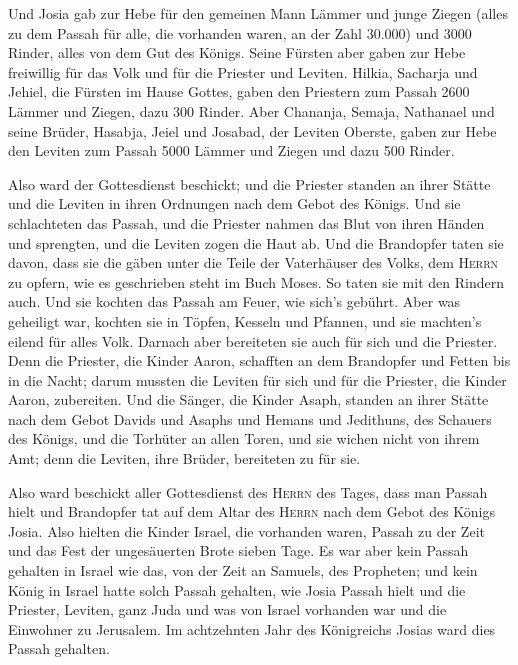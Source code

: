  Und Josia gab zur Hebe für den gemeinen Mann Lämmer und
junge Ziegen (alles zu dem Passah für alle, die vorhanden waren, an der
Zahl 30.000) und 3000 Rinder, alles von dem Gut des Königs.
 Seine Fürsten aber gaben zur Hebe freiwillig für das Volk
und für die Priester und Leviten. Hilkia, Sacharja und Jehiel, die
Fürsten im Hause Gottes, gaben den Priestern zum Passah 2600 Lämmer und
Ziegen, dazu 300 Rinder.  Aber Chananja, Semaja, Nathanael
und seine Brüder, Hasabja, Jeiel und Josabad, der Leviten Oberste, gaben
zur Hebe den Leviten zum Passah 5000 Lämmer und Ziegen und dazu 500
Rinder.

 Also ward der Gottesdienst beschickt; und die Priester
standen an ihrer Stätte und die Leviten in ihren Ordnungen nach dem
Gebot des Königs.  Und sie schlachteten das Passah, und
die Priester nahmen das Blut von ihren Händen und sprengten, und die
Leviten zogen die Haut ab.  Und die Brandopfer taten sie
davon, dass sie die gäben unter die Teile der Vaterhäuser des Volks, dem
\textsc{Herrn} zu opfern, wie es geschrieben steht im Buch Moses. So
taten sie mit den Rindern auch.  Und sie kochten das
Passah am Feuer, wie sich's gebührt. Aber was geheiligt war, kochten sie
in Töpfen, Kesseln und Pfannen, und sie machten's eilend für alles Volk.
 Darnach aber bereiteten sie auch für sich und die
Priester. Denn die Priester, die Kinder Aaron, schafften an dem
Brandopfer und Fetten bis in die Nacht; darum mussten die Leviten für
sich und für die Priester, die Kinder Aaron, zubereiten. 
Und die Sänger, die Kinder Asaph, standen an ihrer Stätte nach dem Gebot
Davids und Asaphs und Hemans und Jedithuns, des Schauers des Königs, und
die Torhüter an allen Toren, und sie wichen nicht von ihrem Amt; denn
die Leviten, ihre Brüder, bereiteten zu für sie.

 Also ward beschickt aller Gottesdienst des
\textsc{Herrn} des Tages, dass man Passah hielt und Brandopfer tat auf
dem Altar des \textsc{Herrn} nach dem Gebot des Königs Josia.
 Also hielten die Kinder Israel, die vorhanden waren,
Passah zu der Zeit und das Fest der ungesäuerten Brote sieben Tage.
 Es war aber kein Passah gehalten in Israel wie das, von
der Zeit an Samuels, des Propheten; und kein König in Israel hatte solch
Passah gehalten, wie Josia Passah hielt und die Priester, Leviten, ganz
Juda und was von Israel vorhanden war und die Einwohner zu Jerusalem.
 Im achtzehnten Jahr des Königreichs Josias ward dies
Passah gehalten.

